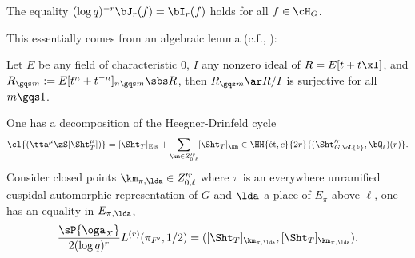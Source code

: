 \documentclass[article, a4paper, twoside]{universal}
\begin{document}

\begin{thm}
	The equality $(\log{q})^{-r}\bJ_{r}(f)=\bI_{r}(f)$ holds for all $f\in\cH_{G}$.
\end{thm}
\begin{rmk}
	This essentially comes from an algebraic lemma (c.f., \cite[Lemma~9.1]{YZShtukas1}):

	Let $E$ be any field of characteristic $0$, $I$ any nonzero ideal of $R=E[t+t\xI]$, and $R_{\gqs m}:=E[t^{n}+t^{-n}]_{n\gqs m}\sbs R$, then $R_{\gqs m}\ar R/I$ is surjective for all $m\gqs1$.
\end{rmk}

\begin{thm}
	One has a decomposition of the Heegner-Drinfeld cycle
	\[
		\cl{(\tta^{\mu}\zS[\Sht_{T}^{\mu}])}=[\Sht_{T}]_{\mathrm{Eis}}+\sum_{\km\in Z_{0,\ell}^{\prime r}}[\Sht_{T}]_{\km}\in\HH{\text{{\'e}t},c}{2r}{(\Sht_{G,\oL{k}}^{\prime r},\bQ_{\ell})(r)}.
	\]
	Consider closed points $\km_{\pi,\lda}\in Z_{0,\ell}^{\prime r}$ where $\pi$ is an everywhere unramified cuspidal automorphic representation of $G$ and $\lda$ a place of $E_{\pi}$ above $\ell$, one has an equality in $E_{\pi,\lda}$,
	\[
		\frac{\sP{\oga_{X}}}{2(\log{q})^{r}}L^{(r)}(\pi_{F'},1/2)=([\Sht_{T}]_{\km_{\pi,\lda}},[\Sht_{T}]_{\km_{\pi,\lda}}).
	\]
\end{thm}



\printref
\end{document}
